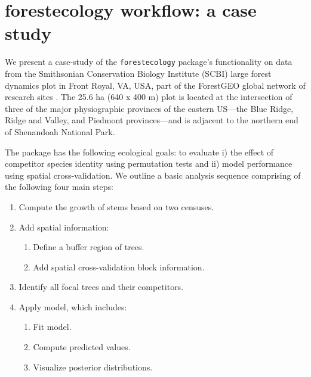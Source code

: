 \documentclass[12pt]{article}
\providecommand{\tightlist}{%
  \setlength{\itemsep}{0pt}\setlength{\parskip}{0pt}}
\begin{document}
\hypertarget{casestudy}{%
\section{forestecology workflow: a case study}\label{casestudy}}

We present a case-study of the \texttt{forestecology} package's
functionality on data from the Smithsonian Conservation Biology
Institute (SCBI) large forest dynamics plot in Front Royal, VA, USA,
part of the ForestGEO global network of research sites
\citep[\citet{andersonteixeira_ctfs-forestgeo_2015}]{bourg_initial_2013}
\citep{bourg_initial_2013}. The 25.6 ha (640 x 400 m) plot is located at
the intersection of three of the major physiographic provinces of the
eastern US---the Blue Ridge, Ridge and Valley, and Piedmont
provinces---and is adjacent to the northern end of Shenandoah National
Park.

The package has the following ecological goals: to evaluate i) the
effect of competitor species identity using permutation tests and ii)
model performance using spatial cross-validation. We outline a basic
analysis sequence comprising of the following four main steps:

\begin{enumerate}
\def\labelenumi{\arabic{enumi}.}
\tightlist
\item
  Compute the growth of stems based on two censuses.
\item
  Add spatial information:

  \begin{enumerate}
  \def\labelenumii{\arabic{enumii}.}
  \tightlist
  \item
    Define a buffer region of trees.
  \item
    Add spatial cross-validation block information.
  \end{enumerate}
\item
  Identify all focal trees and their competitors.
\item
  Apply model, which includes:

  \begin{enumerate}
  \def\labelenumii{\arabic{enumii}.}
  \tightlist
  \item
    Fit model.
  \item
    Compute predicted values.
  \item
    Visualize posterior distributions.
  \end{enumerate}
\end{enumerate}
\end{document}
